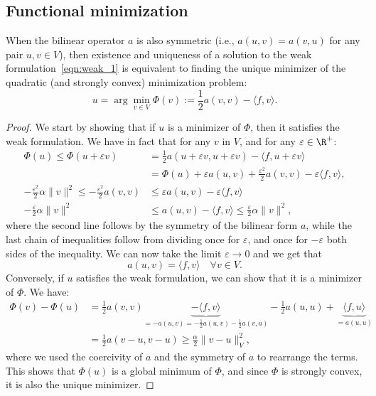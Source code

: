 \subsection{Functional minimization}

\begin{theorem}
When the bilinear operator $a$ is also symmetric (i.e., $a(u,v) = a(v,u)$ for any pair $u,v \in V$), then existence and uniqueness of a solution to the weak formulation~\eqref{eqn:weak_1} is equivalent to finding the unique minimizer of the quadratic (and strongly convex) minimization problem:
\[
u = \arg\min_{v \in V} \Phi(v) := \frac{1}{2} a(v,v) - \langle f, v \rangle.
\]
\end{theorem}
\begin{proof}
 We start by showing that if $u$ is a minimizer of $\Phi$, then it satisfies the weak formulation. We have in fact that for any $v$ in $V$, and for any $\varepsilon \in \R^+$:
 \begin{equation*}
\begin{split}
  \Phi(u) \leq \Phi(u+\varepsilon v)  & = \frac{1}{2} a(u+\varepsilon v, u+\varepsilon v) - \langle f, u+\varepsilon v \rangle \\
  & = \Phi(u) + \varepsilon a(u,v) + \frac{\varepsilon^2}{2} a(v,v) - \varepsilon \langle f, v \rangle, \\
  - \frac{\varepsilon^2}{2} \alpha \|v\|^2 \leq - \frac{\varepsilon^2}{2} a(v,v) & \leq \varepsilon a(u,v) - \varepsilon \langle f, v \rangle \\
  - \frac{\varepsilon}{2} \alpha \|v\|^2 & \leq a(u,v) - \langle f, v \rangle \leq \frac{\varepsilon}{2} \alpha \|v\|^2,
  \end{split}
 \end{equation*}
 where the second line follows by the symmetry of the bilinear form $a$, while the last chain of inequalities follow from dividing once for $\varepsilon$, and once for $-\varepsilon$ both sides of the inequality. We can now take the limit $\varepsilon \to 0$ and we get that
  \[
  a(u,v) = \langle f, v \rangle \quad \forall v \in V.
  \]
  Conversely, if $u$ satisfies the weak formulation, we can show that it is a minimizer of $\Phi$.
  We have:
  \[
  \begin{split}
  \Phi(v) - \Phi(u) & = \frac{1}{2} a(v,v)  \underbrace{- \langle f, v \rangle}_{= - a(u,v)=-\frac12a(u,v)-\frac12a(v,u)} - \frac{1}{2} a(u,u)  + \underbrace{\langle f, u \rangle}_{=a(u,u)} \\
   & = \frac{1}{2} a(v-u,v-u) \geq \frac{\alpha}{2} \|v-u\|_V^2, 
  \end{split}
  \]
  where we used the coercivity of $a$ and the symmetry of $a$ to rearrange the terms. This shows that $\Phi(u)$ is a global minimum of $\Phi$, and since $\Phi$ is strongly convex, it is also the unique minimizer.
\end{proof}

